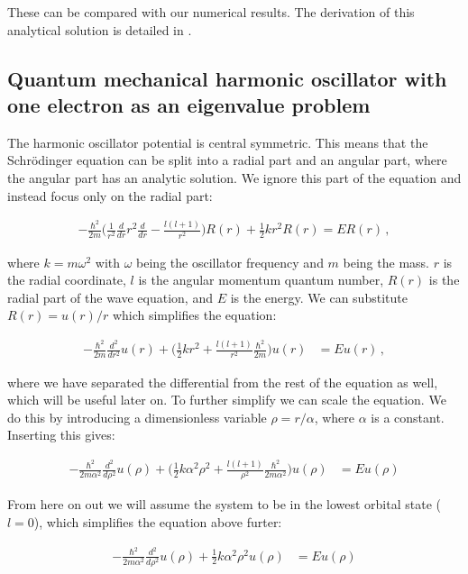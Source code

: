 \documentclass[reprint,english,notitlepage]{revtex4-1}  %
\begin{document}
These can be compared with our numerical results. The derivation of this analytical solution is detailed in \citep{Lyche2017}.



\subsection{Quantum mechanical harmonic oscillator with one electron as an eigenvalue problem} \label{sec:II:d}

The harmonic oscillator potential is central symmetric. This means that the Schrödinger equation can be split into a radial part and an angular part, where the angular part has an analytic solution. We ignore this part of the equation and instead focus only on the radial part:

\begin{align*}
-\frac{\hbar^2}{2m} \bigg( \frac{1}{r^2} \frac{d}{dr}r^2 \frac{d}{dr} - \frac{l(l+1)}{r^2} \bigg) R(r) + \frac{1}{2}kr^2 R(r) = ER(r) \, ,
\end{align*}

where $k = m\omega^2$ with $\omega$ being the oscillator frequency and $m$ being the mass. $r$ is the radial coordinate, $l$ is the angular momentum quantum number, $R(r)$ is the radial part of the wave equation, and $E$ is the energy. We can substitute $R(r) = u(r)/r$ which simplifies the equation:

\begin{align*}
-\frac{\hbar^2}{2m} \frac{d^2}{dr^2} u(r) + \bigg( \frac{1}{2}kr^2 + \frac{l(l+1)}{r^2} \frac{\hbar^2}{2m} \bigg) u(r) &= Eu(r) \, ,
\end{align*}

where we have separated the differential from the rest of the equation as well, which will be useful later on. To further simplify we can scale the equation. We do this by introducing a dimensionless variable $\rho = r/\alpha$, where $\alpha$ is a constant. Inserting this gives:

\begin{align*}
-\frac{\hbar^2}{2m\alpha^2} \frac{d^2}{d\rho^2} u(\rho) + \bigg( \frac{1}{2}k\alpha^2 \rho^2 + \frac{l(l+1)}{\rho^2} \frac{\hbar^2}{2m\alpha^2} \bigg) u(\rho) &= Eu(\rho)
\end{align*}

From here on out we will assume the system to be in the lowest orbital state ($l=0$), which simplifies the equation above furter:

\begin{align*}
-\frac{\hbar^2}{2m\alpha^2} \frac{d^2}{d\rho^2} u(\rho) + \frac{1}{2}k\alpha^2 \rho^2 u(\rho) &= Eu(\rho)
\end{align*}
\end{document}

